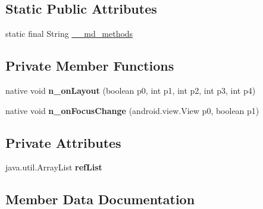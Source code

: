 \subsection*{Static Public Attributes}
\begin{DoxyCompactItemize}
\item 
static final String \hyperlink{classmd5b60ffeb829f638581ab2bb9b1a7f4f3f_1_1ViewRenderer__2_a80b609e3e4054c380887d4dc2907a875}{\+\_\+\+\_\+md\+\_\+methods}
\end{DoxyCompactItemize}
\subsection*{Private Member Functions}
\begin{DoxyCompactItemize}
\item 
\mbox{\label{classmd5b60ffeb829f638581ab2bb9b1a7f4f3f_1_1ViewRenderer__2_a40c528ea52e22dd29fa541de43c0a010}} 
native void {\bfseries n\+\_\+on\+Layout} (boolean p0, int p1, int p2, int p3, int p4)
\item 
\mbox{\label{classmd5b60ffeb829f638581ab2bb9b1a7f4f3f_1_1ViewRenderer__2_a94c144057c065fa69c86c0549ec422ff}} 
native void {\bfseries n\+\_\+on\+Focus\+Change} (android.\+view.\+View p0, boolean p1)
\end{DoxyCompactItemize}
\subsection*{Private Attributes}
\begin{DoxyCompactItemize}
\item 
\mbox{\label{classmd5b60ffeb829f638581ab2bb9b1a7f4f3f_1_1ViewRenderer__2_a6c151401977148a92c515e9c7de1aaf8}} 
java.\+util.\+Array\+List {\bfseries ref\+List}
\end{DoxyCompactItemize}


\subsection{Member Data Documentation}
\mbox{\label{classmd5b60ffeb829f638581ab2bb9b1a7f4f3f_1_1ViewRenderer__2_a80b609e3e4054c380887d4dc2907a875}} 
